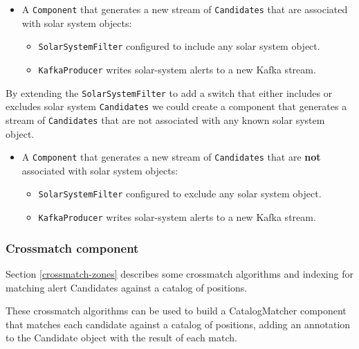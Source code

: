 \documentclass{article}
\newcommand{\kafka} {Kafka\xspace}
\newcommand{\crossmatch} {crossmatch\xspace}
\newcommand{\javaname}[1] {{\ttfamily\color{codeblue} #1}}
\begin{document}
\begin{itemize}
    \item A \texttt{Component} that generates a new stream of \texttt{Candidates} that are associated with solar system objects:
    \begin{itemize}
        \item \texttt{SolarSystemFilter} configured to include any solar system object.
    \end{itemize}
    \begin{itemize}
        \item \texttt{KafkaProducer} writes solar-system alerts to a new \kafka stream.
    \end{itemize}
\end{itemize}

By extending the \texttt{SolarSystemFilter} to add a switch that either includes or excludes solar system \texttt{Candidates} we could create a component that generates a stream of \texttt{Candidates} that are not associated with any known solar system object.

\begin{itemize}
    \item A \texttt{Component} that generates a new stream of \texttt{Candidates} that are \textbf{not} associated with solar system objects:
    \begin{itemize}
        \item \texttt{SolarSystemFilter} configured to exclude any solar system object.
    \end{itemize}
    \begin{itemize}
        \item \texttt{KafkaProducer} writes solar-system alerts to a new \kafka stream.
    \end{itemize}
\end{itemize}

\subsubsection{Crossmatch component}
\label{workflow.cross-match}

Section \ref{crossmatch-zones} describes some \crossmatch algorithms and indexing for matching alert Candidates against a catalog of positions.

These \crossmatch algorithms can be used to build a \javaname{CatalogMatcher} component that matches each candidate against a catalog of positions, adding an annotation to the \javaname{Candidate} object with the result of each match.
\end{document}
